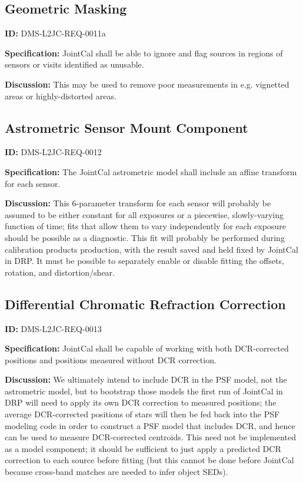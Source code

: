 \documentclass[SE,toc,lsstdraft]{lsstdoc}
\begin{document}
\subsection{Geometric Masking}

\label{DMS-L2JC-REQ-0011a}
\textbf{ID:} DMS-L2JC-REQ-0011a

\textbf{Specification:}
JointCal shall be able to ignore and flag sources in regions of sensors or visits identified as unusable.

\textbf{Discussion:}
This may be used to remove poor measurements in e.g. vignetted areas or highly-distorted areas.

\subsection{Astrometric Sensor Mount Component}

\label{DMS-L2JC-REQ-0012}
\textbf{ID:} DMS-L2JC-REQ-0012

\textbf{Specification:}
The JointCal astrometric model shall include an affine transform for each sensor.

\textbf{Discussion:}
This 6-parameter transform for each sensor will probably be assumed to be either constant for all exposures or a piecewise, slowly-varying function of time; fits that allow them to vary independently for each exposure should be possible as a diagnostic.  This fit will probably be performed during calibration products production, with the result saved and held fixed by JointCal in DRP.  It must be possible to separately enable or disable fitting the offsets, rotation, and distortion/shear.

\subsection{Differential Chromatic Refraction Correction}

\label{DMS-L2JC-REQ-0013}
\textbf{ID:} DMS-L2JC-REQ-0013

\textbf{Specification:}
JointCal shall be capable of working with both DCR-corrected positions and positions measured without DCR correction.

\textbf{Discussion:}
We ultimately intend to include DCR in the PSF model, not the astrometric model, but to bootstrap those models the first run of JointCal in DRP will need to apply its own DCR correction to measured positions; the average DCR-corrected positions of stars will then be fed back into the PSF modeling code in order to construct a PSF model that includes DCR, and hence can be used to measure DCR-corrected centroids.  This need not be implemented as a model component; it should be sufficient to just apply a predicted DCR correction to each source before fitting (but this cannot be done before JointCal because cross-band matches are needed to infer object SEDs).
\end{document}
